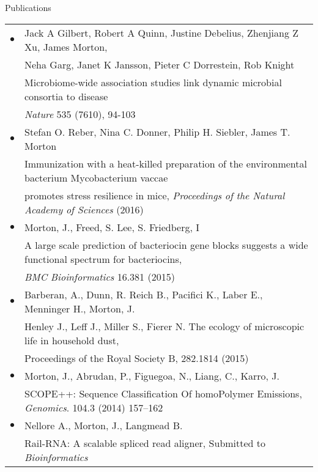 \documentclass{resume} %
\begin{document}
\begin{rSection}{Publications}
  \begin{tabular}{ll}
    $\bullet$ & Jack A Gilbert, Robert A Quinn, Justine Debelius, Zhenjiang Z Xu, James Morton, \\
    & Neha Garg, Janet K Jansson, Pieter C Dorrestein, Rob Knight \\
    & Microbiome-wide association studies link dynamic microbial consortia to disease\\
    & \textit{Nature} 535 (7610), 94-103\\
    $\bullet$ & Stefan O. Reber, Nina C. Donner, Philip H. Siebler, James T. Morton \\
    & Immunization with a heat-killed preparation of the environmental bacterium Mycobacterium vaccae \\
    & promotes stress resilience in mice, \textit{Proceedings of the Natural Academy of Sciences} (2016)\\
%
    $\bullet$ & Morton, J., Freed, S. Lee, S. Friedberg, I \\
    & A large scale prediction of bacteriocin gene blocks suggests a wide functional spectrum for bacteriocins, \\
    & \textit{BMC Bioinformatics} 16.381 (2015)\\
%
    $\bullet$ & Barberan, A., Dunn, R. Reich B., Pacifici K., Laber E., Menninger H., Morton, J. \\
    & Henley J., Leff J., Miller S., Fierer N. The ecology of microscopic life in household dust, \\
    & Proceedings of the Royal Society B, 282.1814 (2015) \\

    $\bullet$ & Morton, J.,  Abrudan, P.,  Figuegoa, N., Liang, C., Karro, J. \\
    & SCOPE++: Sequence Classification Of homoPolymer Emissions, \textit{Genomics}. 104.3 (2014) 157--162 \\
%
    $\bullet$ & Nellore A., Morton, J., Langmead B. \\
    & Rail-RNA: A scalable spliced read aligner, Submitted to \textit{Bioinformatics}\\
%
  \end{tabular}
\end{rSection}
\newpage
\end{document}
